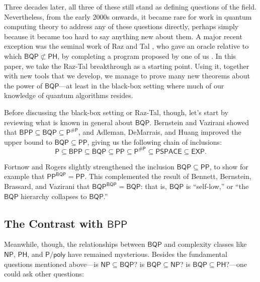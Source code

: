 \documentclass[10pt,a4paper]{article}
\begin{document}
Three decades later, all three of these still stand as defining
questions of the field.  Nevertheless, from the early 2000s onwards, it became rare for work in quantum computing theory to address any of these questions directly, perhaps simply because it became too hard to say anything new about them.  A major recent exception was the seminal work of Raz and Tal \cite{RT19}, who gave an oracle relative to which $\mathsf{BQP}\not\subset\mathsf{PH}$, by completing a program proposed by one of us \cite{Aar10}.  In this paper, we take the Raz-Tal breakthrough as a starting point.  Using it, together with new tools that we develop, we manage to prove many new theorems about the power of $\mathsf{BQP}$---at least in the black-box setting where much of our knowledge of quantum
algorithms resides.

Before discussing the black-box setting or Raz-Tal, though, let's
start by reviewing what is known in general about $\mathsf{BQP}$. Bernstein and Vazirani \cite{BV97} showed that $\mathsf{BPP} \subseteq \mathsf{BQP} \subseteq \mathsf{P^{\# P}}$, and Adleman, DeMarrais, and Huang \cite{ADH97} improved the upper bound to $\mathsf{BQP} \subseteq \mathsf{PP}$, giving us the following chain of inclusions:
\[
\mathsf{P} \subseteq \mathsf{BPP} \subseteq \mathsf{BQP} \subseteq \mathsf{PP} \subseteq \mathsf{P^{\# P}} \subseteq \mathsf{PSPACE} \subseteq \mathsf{EXP}.
\]

Fortnow and Rogers \cite{FR98} slightly strengthened the inclusion $\mathsf{BQP} \subseteq \mathsf{PP}$, to show for example that $\mathsf{PP^{BQP}} = \mathsf{PP}$.  This complemented the result of Bennett, Bernstein, Brassard, and Vazirani \cite{BBBV97} that $\mathsf{BQP^{BQP}} = \mathsf{BQP}$: that is, $\mathsf{BQP}$ is ``self-low,'' or ``the $\mathsf{BQP}$ hierarchy collapses to $\mathsf{BQP}$.''

\subsection{The Contrast with \texorpdfstring{$\mathsf{BPP}$}{BPP}}
\label{sec:contrast_with_bpp}

Meanwhile, though, the relationships between $\mathsf{BQP}$ and complexity classes like $\mathsf{NP}$, $\mathsf{PH}$, and $\mathsf{P/poly}$ have remained mysterious.  Besides the
fundamental questions mentioned above---is $\mathsf{NP} \subseteq \mathsf{BQP}$? is $\mathsf{BQP} \subseteq \mathsf{NP}$? is $\mathsf{BQP} \subseteq \mathsf{PH}$?---one could ask other questions:
\end{document}

